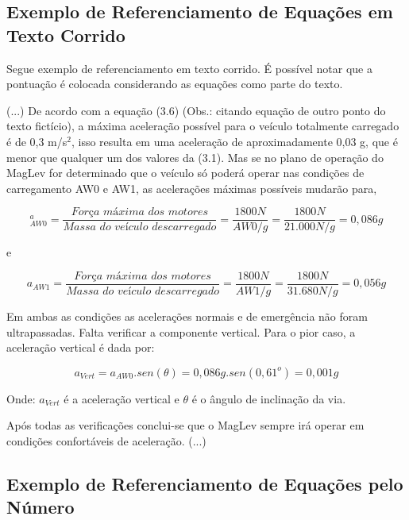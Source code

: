 \documentclass[
        oneside,      %
        english,			
        brazil			 
        ]{configcefetmglpd}
\begin{document}
\subsection{Exemplo de Referenciamento de Equações em Texto Corrido} \label{subsec:refer_eq_texto_corrido}
Segue exemplo de referenciamento em texto corrido. É possível notar que a pontuação é colocada considerando as equações como parte do texto.

(...) De acordo com a equação (3.6) (Obs.: citando equação de outro ponto do texto fictício), a máxima aceleração possível para o veículo totalmente carregado é de 0,3 m/s$^2$, isso resulta em uma aceleração de aproximadamente 0,03 g, que é menor que qualquer um dos valores da (3.1). Mas se no plano de operação do MagLev for determinado que o veículo só poderá operar nas condições de carregamento AW0 e AW1, as acelerações máximas possíveis mudarão para,

\begin{equation}
	\label{eq:Aw0}
^	a_{AW0} = \frac{\textit{Força~máxima~dos~motores}}{\textit{Massa~do~veículo~descarregado}} = \frac{1800N}{AW0/g}
	=\frac{1800N}{21.000N/g}=0,086g
\end{equation}

e

\begin{equation}
	\label{eq:Aw1}
	a_{AW1} = \frac{\textit{Força~máxima~dos~motores}}{\textit{Massa~do~veículo~descarregado}} = \frac{1800N}{AW1/g}
	=\frac{1800N}{31.680N/g}=0,056g
\end{equation}

Em ambas as condições as acelerações normais e de emergência não foram ultrapassadas. Falta verificar a componente vertical. Para o pior caso, a aceleração vertical é dada por:

\begin{equation}
	\label{eq:Avert}
	a_{Vert} = a_{AW0}.sen(\theta)=0,086g.sen(0,61^o)=0,001g
\end{equation}

Onde: $a_{Vert}$ é a aceleração vertical e $\theta$ é o ângulo de inclinação da via.

Após todas as verificações conclui-se que o MagLev sempre irá operar em condições confortáveis de aceleração. (...)

\subsection{Exemplo de Referenciamento de Equações pelo Número} \label{subsec:eq_ref_numero}
\end{document}
